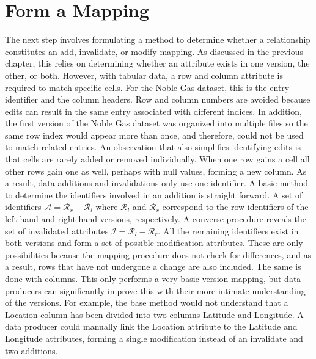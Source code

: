 \section{Form a Mapping} \label{mapping}

The next step involves formulating a method to determine whether a relationship constitutes an add, invalidate, or modify mapping.
As discussed in the previous chapter, this relies on determining whether an attribute exists in one version, the other, or both.
However, with tabular data, a row and column attribute is required to match specific cells.
For the Noble Gas dataset, this is the entry identifier and the column headers.
Row and column numbers are avoided because edits can result in the same entry associated with different indices.
In addition, the first version of the Noble Gas dataset was organized into multiple files so the same row index would appear more than once, and therefore, could not be used to match related entries.
An observation that also simplifies identifying edits is that cells are rarely added or removed individually.
When one row gains a cell all other rows gain one as well, perhaps with null values, forming a new column.
As a result, data additions and invalidations only use one identifier.
A basic method to determine the identifiers involved in an addition is straight forward.
A set of identifiers \(\mathcal{A} = \mathcal{R}_{r} - \mathcal{R}_{l}\) where \(\mathcal{R}_{l}\) and \(\mathcal{R}_{r}\) correspond to the row identifiers of the left-hand and right-hand versions, respectively.
A converse procedure reveals the set of invalidated attributes \(\mathcal{I} = \mathcal{R}_{l} - \mathcal{R}_{r}\).
All the remaining identifiers exist in both versions and form a set of possible modification attributes.
These are only possibilities because the mapping procedure does not check for differences, and as a result, rows that have not undergone a change are also included.
The same is done with columns.
This only performs a very basic version mapping, but data producers can significantly improve this with their more intimate understanding of the versions.
For example, the base method would not understand that a Location column has been divided into two columns Latitude and Longitude.
A data producer could manually link the Location attribute to the Latitude and Longitude attributes, forming a single modification instead of an invalidate and two additions.

